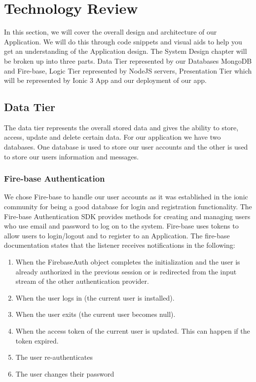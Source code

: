 \documentclass[12pt,a4paper,oneside,openany]{book}
\begin{document}
\chapter{Technology Review}
In this section, we will cover the overall design and architecture of our Application. We will do this through code snippets and visual aids to help you get an understanding of the Application design. The System Design chapter will be broken up into three parts. Data Tier represented by our Databases MongoDB and Fire-base, Logic Tier represented by NodeJS servers, Presentation Tier which will be represented by Ionic 3 App and our deployment of our app. 

\section{Data Tier}
The data tier represents the overall stored data and gives the ability to store, access, update and delete certain data. For our application we have two databases. One database is used to store our user accounts and the other is used to store our users information and messages.

\subsection{Fire-base Authentication}
We chose Fire-base to handle our user accounts as it was established in the ionic community for being a good database for login and registration functionality. The Fire-base Authentication SDK provides methods for creating and managing users who use email and password to log on to the system. Fire-base uses tokens to allow users to login/logout and to register to an Application. The fire-base documentation states that the listener receives notifications in the following: 
\begin{enumerate}
    \item When the FirebaseAuth object completes the initialization and the user is already authorized in the previous session or is redirected from the input stream of the other authentication provider.
    \item When the user logs in (the current user is installed).
    \item When the user exits (the current user becomes null).
    \item When the access token of the current user is updated. This can happen if the token expired.
    \item The user re-authenticates
    \item The user changes their password
\end{enumerate}
\end{document}
